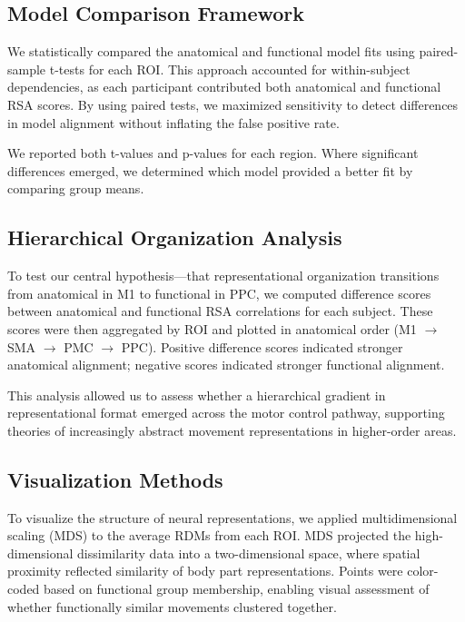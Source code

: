 \documentclass{article}
\begin{document}
\subsection{Model Comparison Framework}
We statistically compared the anatomical and functional model fits using paired-sample t-tests for each ROI. This approach accounted for within-subject dependencies, as each participant contributed both anatomical and functional RSA scores. By using paired tests, we maximized sensitivity to detect differences in model alignment without inflating the false positive rate.

We reported both t-values and p-values for each region. Where significant differences emerged, we determined which model provided a better fit by comparing group means.

\subsection{Hierarchical Organization Analysis}
To test our central hypothesis—that representational organization transitions from anatomical in M1 to functional in PPC, we computed difference scores between anatomical and functional RSA correlations for each subject. These scores were then aggregated by ROI and plotted in anatomical order (M1 $\rightarrow$ SMA $\rightarrow$ PMC $\rightarrow$ PPC). Positive difference scores indicated stronger anatomical alignment; negative scores indicated stronger functional alignment.

This analysis allowed us to assess whether a hierarchical gradient in representational format emerged across the motor control pathway, supporting theories of increasingly abstract movement representations in higher-order areas.

\subsection{Visualization Methods}
To visualize the structure of neural representations, we applied multidimensional scaling (MDS) to the average RDMs from each ROI. MDS projected the high-dimensional dissimilarity data into a two-dimensional space, where spatial proximity reflected similarity of body part representations. Points were color-coded based on functional group membership, enabling visual assessment of whether functionally similar movements clustered together. 
\end{document}
